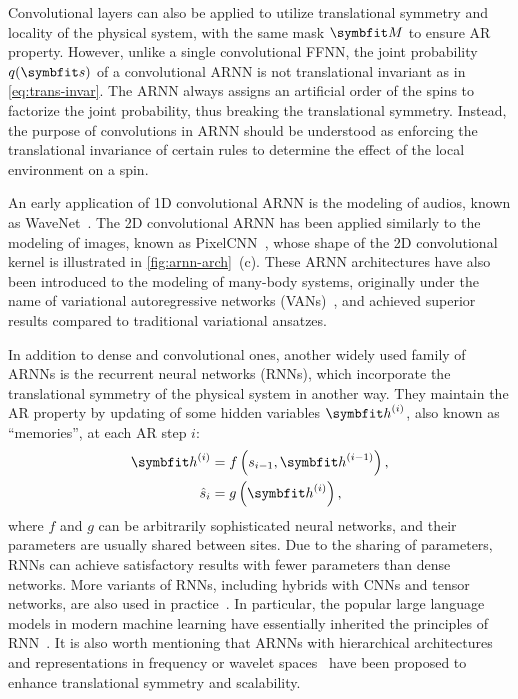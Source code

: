 Convolutional layers can also be applied to utilize translational symmetry and locality of the physical system, with the same mask $\mM$ to ensure AR property. However, unlike a single convolutional FFNN, the joint probability $q(\vs)$ of a convolutional ARNN is not translational invariant as in \cref{eq:trans-invar}. The ARNN always assigns an artificial order of the spins to factorize the joint probability, thus breaking the translational symmetry. Instead, the purpose of convolutions in ARNN should be understood as enforcing the translational invariance of certain rules to determine the effect of the local environment on a spin.

An early application of 1D convolutional ARNN is the modeling of audios, known as WaveNet~\cite{oord2016wavenet}. The 2D convolutional ARNN has been applied similarly to the modeling of images, known as PixelCNN~\cite{oord2016pixel}, whose shape of the 2D convolutional kernel is illustrated in \cref{fig:arnn-arch}~(c). These ARNN architectures have also been introduced to the modeling of many-body systems, originally under the name of variational autoregressive networks (VANs)~\cite{wu2019solving}, and achieved superior results compared to traditional variational ansatzes.

In addition to dense and convolutional ones, another widely used family of ARNNs is the recurrent neural networks (RNNs), which incorporate the translational symmetry of the physical system in another way. They maintain the AR property by updating of some hidden variables $\vh^{(i)}$, also known as ``memories'', at each AR step $i$:
\begin{align}
\vh^{(i)} &= f\left( s_{i - 1}, \vh^{(i - 1)} \right), \label{eq:rnn-update} \\
\hat{s}_i &= g\left( \vh^{(i)} \right), \label{eq:rnn-output}
\end{align}
where $f$ and $g$ can be arbitrarily sophisticated neural networks, and their parameters are usually shared between sites. Due to the sharing of parameters, RNNs can achieve satisfactory results with fewer parameters than dense networks. More variants of RNNs, including hybrids with CNNs and tensor networks, are also used in practice~\cite{oord2016pixel, khandoker2023supplementing}. In particular, the popular large language models in modern machine learning have essentially inherited the principles of RNN~\cite{brown2020language}. It is also worth mentioning that ARNNs with hierarchical architectures~\cite{bialas2022hierarchical} and representations in frequency or wavelet spaces~\cite{nash2021generating, mattar2024wavelets} have been proposed to enhance translational symmetry and scalability.


